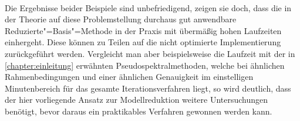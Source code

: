\documentclass[../main.tex]{subfiles}
\begin{document}
\paragraph{}
Die Ergebnisse beider Beispiele sind unbefriedigend, zeigen sie doch, dass die in der Theorie auf diese Problemstellung durchaus gut anwendbare Reduzierte"=Basis"=Methode in der Praxis mit übermäßig hohen Laufzeiten einhergeht.
Diese können zu Teilen auf die nicht optimierte Implementierung zurückgeführt werden.
Vergleicht man aber beispielsweise die Laufzeit mit der in \cref{chapter:einleitung} erwähnten Pseudospektralmethoden, welche bei ähnlichen Rahmenbedingungen und einer ähnlichen Genauigkeit im einstelligen Minutenbereich für das gesamte Iterationsverfahren liegt, so wird deutlich,
dass der hier vorliegende Ansatz zur Modellreduktion weitere Untersuchungen benötigt, bevor daraus ein praktikables Verfahren gewonnen werden kann.
\end{document}

